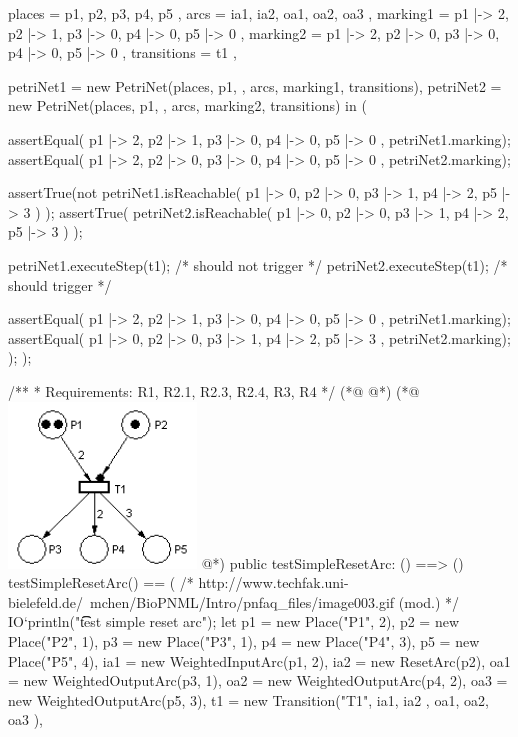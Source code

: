 \begin{vdmpp}
     places = { p1, p2, p3, p4, p5 },
     arcs = { ia1, ia2, oa1, oa2, oa3 },
     marking1 = { p1 |-> 2, p2 |-> 1, p3 |-> 0, p4 |-> 0, p5 |-> 0 },
     marking2 = { p1 |-> 2, p2 |-> 0, p3 |-> 0, p4 |-> 0, p5 |-> 0 },
     transitions = { t1 },

     petriNet1 = new PetriNet(places, p1, {}, arcs, marking1, transitions),
     petriNet2 = new PetriNet(places, p1, {}, arcs, marking2, transitions) in (

      assertEqual({ p1 |-> 2, p2 |-> 1, p3 |-> 0, p4 |-> 0, p5 |-> 0 }, petriNet1.marking);
      assertEqual({ p1 |-> 2, p2 |-> 0, p3 |-> 0, p4 |-> 0, p5 |-> 0 }, petriNet2.marking);

      assertTrue(not petriNet1.isReachable(
        { p1 |-> 0, p2 |-> 0, p3 |-> 1, p4 |-> 2, p5 |-> 3 })
      );
      assertTrue( petriNet2.isReachable(
        { p1 |-> 0, p2 |-> 0, p3 |-> 1, p4 |-> 2, p5 |-> 3 })
      );

      petriNet1.executeStep(t1); /* should not trigger */
      petriNet2.executeStep(t1); /* should trigger */

      assertEqual({ p1 |-> 2, p2 |-> 1, p3 |-> 0, p4 |-> 0, p5 |-> 0 }, petriNet1.marking);
      assertEqual({ p1 |-> 0, p2 |-> 0, p3 |-> 1, p4 |-> 2, p5 |-> 3 }, petriNet2.marking);
    );
  );

  /**
   * Requirements: R1, R2.1, R2.3, R2.4, R3, R4
   */
(*@
\label{testSimpleResetArc:221}
@*)
(*@
\includegraphics[width=5cm]{specification/simpleresetarc.png}
@*)
  public testSimpleResetArc: () ==> ()
  testSimpleResetArc() == (
    /* http://www.techfak.uni-bielefeld.de/~mchen/BioPNML/Intro/pnfaq_files/image003.gif (mod.) */
    IO`println("\t\t test simple reset arc");
    let p1 = new Place("P1", 2),
     p2 = new Place("P2", 1),
     p3 = new Place("P3", 1),
     p4 = new Place("P4", 3),
     p5 = new Place("P5", 4),
     ia1 = new WeightedInputArc(p1,  2),
     ia2 = new ResetArc(p2),
     oa1 = new WeightedOutputArc(p3, 1),
     oa2 = new WeightedOutputArc(p4, 2),
     oa3 = new WeightedOutputArc(p5, 3),
     t1 = new Transition("T1", { ia1, ia2 }, { oa1, oa2, oa3 }),


\end{vdmpp}
